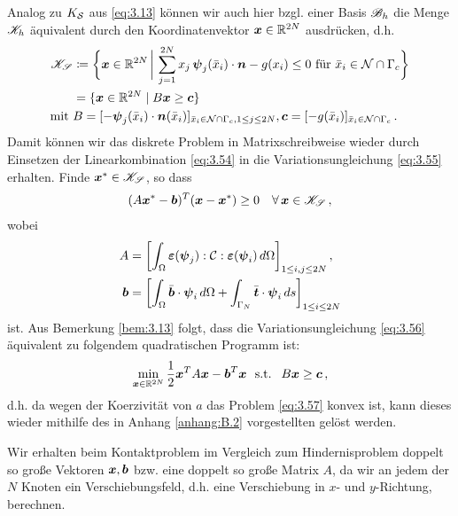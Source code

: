 Analog zu $K_{\mathcal S}$ aus \eqref{eq:3.13} können wir auch hier bzgl. einer Basis $\mathscr B_h$ die Menge $\mathscr K_h$ äquivalent durch den Koordinatenvektor $\boldsymbol x \in \mathbb{R}^{2N}$ ausdrücken, d.h.
\begin{align*}
	\mathscr K_{\mathscr S}  &\coloneqq \bigg\{ \boldsymbol x \in \mathbb{R}^{2N} \,\bigg| \, \sum_{j=1}^{2N} x_j \, \boldsymbol \psi_j(\bar x_i) \cdot \boldsymbol n- g(x_i) \le 0 \text{ für } \bar x_i \in \mathcal N \cap \Gamma_c\bigg\} \\
	& = \{ \boldsymbol x \in \mathbb{R}^{2N} \mid B\boldsymbol x \ge \boldsymbol c\} \\
	\text{mit } & B =  [-\boldsymbol \psi_j(\bar x_i)\cdot \boldsymbol n(\bar x_i)]_{\bar x_i \in \mathcal N \cap \Gamma_c, 1\le j \le 2N} ,\boldsymbol c = [-g(\bar x_i)]_{\bar x_i \in\mathcal N \cap \Gamma_c} \, .
\end{align*}
Damit können wir das diskrete Problem in Matrixschreibweise wieder durch Einsetzen der Linearkombination \eqref{eq:3.54} in die Variationsungleichung \eqref{eq:3.55} erhalten. Finde $\boldsymbol x^* \in \mathscr K_{\mathscr S}$, so dass
\begin{align}\label{eq:3.56}
	(A\boldsymbol x^* - \boldsymbol b)^T (\boldsymbol x - \boldsymbol x^*) \ge 0 \quad \forall \, \boldsymbol x\in \mathscr K_{\mathscr S} \, ,
\end{align}
wobei
\begin{align*}
	A &= \left[\int_\Omega \boldsymbol {\varepsilon} (\boldsymbol \psi_j):\mathcal C:\boldsymbol {\varepsilon}(\boldsymbol \psi_i) \, d\Omega\right]_{1 \le i,j\le 2N} , \\
	 \boldsymbol b& = \left[ \int_\Omega \bar{\boldsymbol b} \cdot \boldsymbol\psi_i \, d\Omega + \int_{\Gamma_N} \bar{\boldsymbol 	t} \cdot \boldsymbol\psi_i \, ds\right]_{1\le i \le 2N}
\end{align*}
ist. Aus Bemerkung \ref{bem:3.13} folgt, dass die Variationsungleichung \eqref{eq:3.56} äquivalent zu folgendem quadratischen Programm ist:
\begin{align}\label{eq:3.57}
\min_{\bs x\in \R^{2N}} \frac 1 2 \bs x^T A \bs x - \bs b^T \bs x \ \text{ s.t. } \ B\bs x \ge \bs c \, ,
\end{align}
d.h. da wegen der Koerzivität von $a$ das Problem \eqref{eq:3.57} konvex ist, kann dieses wieder mithilfe des in Anhang \ref{anhang:B.2} vorgestellten  gelöst werden.

\begin{bem}\label{bem:3.25}
Wir erhalten beim Kontaktproblem im Vergleich zum Hindernisproblem  doppelt so große Vektoren $\boldsymbol x, \boldsymbol b$ bzw. eine doppelt so große Matrix $A$, da wir an jedem der $N$ Knoten ein Verschiebungsfeld, d.h. eine Verschiebung in $x$- und $y$-Richtung, berechnen.
\end{bem}





\newpage

